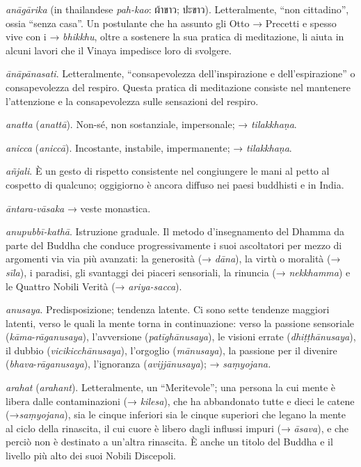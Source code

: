 \emph{anāgārika} (in thailandese \emph{pah-kao}: ผ้าขาว; ปะขาว).
Letteralmente, ``non cittadino'', ossia ``senza casa''. Un postulante
che ha assunto gli Otto → Precetti e spesso vive con i → \emph{bhikkhu},
oltre a sostenere la sua pratica di meditazione, li aiuta in alcuni
lavori che il Vinaya impedisce loro di svolgere.

\emph{ānāpānasati}. Letteralmente, ``consapevolezza dell'inspirazione e
dell'espirazione'' o consapevolezza del respiro. Questa pratica di
meditazione consiste nel mantenere l'attenzione e la consapevolezza
sulle sensazioni del respiro.

\emph{anatta} (\emph{anattā}). Non-sé, non sostanziale, impersonale; →
\emph{tilakkhaṇa}.

\emph{anicca} (\emph{aniccā}). Incostante, instabile, impermanente; →
\emph{tilakkhaṇa}.

\emph{añjali}. È un gesto di rispetto consistente nel congiungere le
mani al petto al cospetto di qualcuno; oggigiorno è ancora diffuso nei
paesi buddhisti e in India.

\emph{āntara-vāsaka} → veste monastica.

\emph{anupubbī-kathā}. Istruzione graduale. Il metodo d'insegnamento del
Dhamma da parte del Buddha che conduce progressivamente i suoi
ascoltatori per mezzo di argomenti via via più avanzati: la generosità
(→ \emph{dāna}), la virtù o moralità (→ \emph{sīla}), i paradisi, gli
svantaggi dei piaceri sensoriali, la rinuncia (→ \emph{nekkhamma}) e le
Quattro Nobili Verità (→ \emph{ariya-sacca}).

\emph{anusaya}. Predisposizione; tendenza latente. Ci sono sette
tendenze maggiori latenti, verso le quali la mente torna in
continuazione: verso la passione sensoriale
(\emph{kāma}-\emph{rāganusaya}), l'avversione (\emph{patīghānusaya}),
le visioni errate (\emph{dhiṭṭhānusaya}), il dubbio
(\emph{vicikicchānusaya}), l'orgoglio (\emph{mānusaya}), la passione
per il divenire (\emph{bhava}-\emph{rāganusaya}), l'ignoranza
(\emph{avijjānusaya}); → \emph{saṃyojana.}

\emph{arahat} (\emph{arahant}). Letteralmente, un ``Meritevole''; una
persona la cui mente è libera dalle contaminazioni (→ \emph{kilesa}),
che ha abbandonato tutte e dieci le catene (→\emph{saṃyojana}), sia le
cinque inferiori sia le cinque superiori che legano la mente al ciclo
della rinascita, il cui cuore è libero dagli influssi impuri (→
\emph{āsava}), e che perciò non è destinato a un'altra rinascita. È
anche un titolo del Buddha e il livello più alto dei suoi Nobili
Discepoli.

